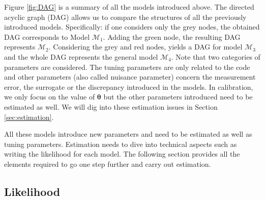 \documentclass[soumission]{jsfds}
\edef\hc{\string: }
\begin{document}
Figure \ref{fig:DAG} is a summary of all the models introduced above. The directed acyclic graph (DAG) allows us to compare the structures of all the previously introduced models. 
Specifically\hc if one considers only the grey nodes, the obtained DAG corresponds to Model $\mathcal{M}_1$. Adding the green node, the resulting DAG represents $\mathcal{M}_2$. Considering the grey and red nodes, yields a DAG for model $\mathcal{M}_3$ and the whole DAG represents the general model $\mathcal{M}_4$. Note that two categories of parameters are considered. The tuning parameters are only related to the code and other parameters (also called nuisance parameter) concern the measurement error, the surrogate or the discrepancy introduced in the models. In calibration, we only focus on the value of $\boldsymbol{\theta}$ but the other parameters introduced need to be estimated as well. We will dig into these estimation issues in Section \ref{sec:estimation}.\newline

All these models introduce new parameters and need to be estimated as well as tuning parameters. Estimation needs to dive into technical aspects such as writing the likelihood for each model. The following section provides all the elements required to go one step further and carry out estimation. \newline


\subsection{Likelihood}
\end{document}
